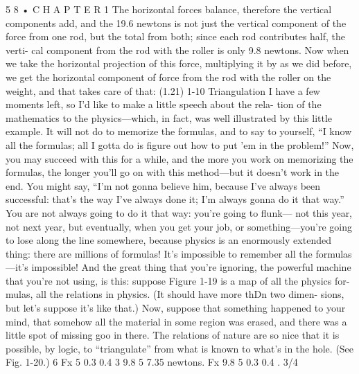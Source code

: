 \documentclass[10pt,oneside]{article}
\begin{document}
5 8 • C H A P T E R  1 The horizontal forces balance, therefore the vertical components add, and the 19.6 newtons is not just the vertical component of the force from one rod, but the total from both; since each rod contributes half, the verti- cal component from the rod with the roller is only 9.8 newtons. Now when we take the horizontal projection of this force, multiplying it by as we did before, we get the horizontal component of force from the rod with the roller on the weight, and that takes care of that: (1.21) 1-10 Triangulation I have a few moments left, so I’d like to make a little speech about the rela- tion of the mathematics to the physics---which, in fact, was well illustrated by this little example. It will not do to memorize the formulas, and to say to yourself, “I know all the formulas; all I gotta do is figure out how to put ’em in the problem!” Now, you may succeed with this for a while, and the more you work on memorizing the formulas, the longer you’ll go on with this method---but it doesn’t work in the end. You might say, “I’m not gonna believe him, because I’ve always been successful: that’s the way I’ve always done it; I’m always gonna do it that way.” You are not always going to do it that way: you’re going to flunk--- not this year, not next year, but eventually, when you get your job, or something---you’re going to lose along the line somewhere, because physics is an enormously extended thing: there are millions of formulas! It’s impossible to remember all the formulas---it’s impossible! And the great thing that you’re ignoring, the powerful machine that you’re not using, is this: suppose Figure 1-19 is a map of all the physics for- mulas, all the relations in physics. (It should have more thDn two dimen- sions, but let’s suppose it’s like that.) Now, suppose that something happened to your mind, that somehow all the material in some region was erased, and there was a little spot of missing goo in there. The relations of nature are so nice that it is possible, by logic, to “triangulate” from what is known to what’s in the hole. (See Fig. 1-20.) 6  Fx 5 0.3 0.4 3 9.8 5 7.35 newtons. Fx 9.8 5 0.3 0.4 . 3/4\par
\end{document}
